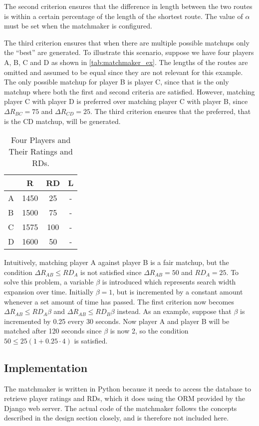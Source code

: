 The second criterion ensures that the difference in length between the two routes is within a certain percentage of the length of the shortest route.
The value of $\alpha$ must be set when the matchmaker is configured.

The third criterion ensures that when there are multiple possible matchups only the ``best'' are generated.
To illustrate this scenario, suppose we have four players A, B, C and D as shown in \autoref{tab:matchmaker_ex}.
The lengths of the routes are omitted and assumed to be equal since they are not relevant for this example.
The only possible matchup for player B is player C, since that is the only matchup where both the first and second criteria are satisfied.
However, matching player C with player D is preferred over matching player C with player B, since $\Delta R_{BC} = 75$ and $\Delta R_{CD} = 25$.
The third criterion ensures that the preferred, that is the CD matchup, will be generated.

\begin{table}[!ht]
	\centering
	\begin{tabular}{l c c c}
			& R		& RD	& L \\
		\hline
		A	& 1450	& 25	& - \\
		B	& 1500	& 75	& - \\
		C	& 1575	& 100	& - \\
		D	& 1600	& 50	& -
	\end{tabular}
	\caption{Four Players and Their Ratings and RDs.}
	\label{tab:matchmaker_ex}
\end{table}

Intuitively, matching player A against player B is a fair matchup, but the condition $\Delta R_{AB} \leq RD_A$ is not satisfied since $\Delta R_{AB} = 50$ and $RD_A = 25$.
To solve this problem, a variable $\beta$ is introduced which represents search width expansion over time.
Initially $\beta = 1$, but is incremented by a constant amount whenever a set amount of time has passed.
The first criterion now becomes $\Delta R_{AB} \leq RD_A\beta$ and $\Delta R_{AB} \leq RD_B\beta$ instead.
As an example, suppose that $\beta$ is incremented by 0.25 every 30 seconds.
Now player A and player B will be matched after 120 seconds since $\beta$ is now 2, so the condition $50 \leq 25\left(1+0.25\cdot4\right)$ is satisfied.

\subsection{Implementation}
The matchmaker is written in Python because it needs to access the database to retrieve player ratings and RDs, which it does using the \ac{ORM} provided by the Django web server.
The actual code of the matchmaker follows the concepts described in the design section closely, and is therefore not included here.

